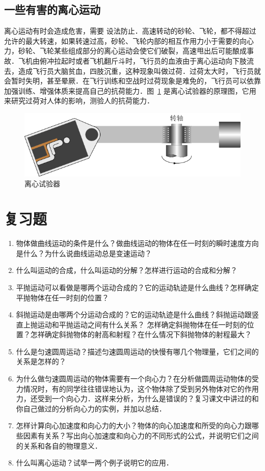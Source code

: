 \subsection{一些有害的离心运动} 

离心运动有时会造成危害，需要
设法防止．高速转动的砂轮、飞轮，都不得超过允许的最大转速，如果转速过高，砂轮、飞轮内部的相互作用力小于需要的向心力，砂轮、飞轮某些组成部分的离心运动会使它们破裂，高速甩出后可能酿成事故．飞机由俯冲拉起时或者飞机翻斤斗时，飞行员的血液由于离心运动向下肢流去，造成飞行员大脑贫血，四肢沉重，这种现象叫做过荷．过荷太大时，飞行员就会暂时失明，甚至晕厥．在飞行训练和空战时过荷现象是难免的，飞行员可以依靠加强训练、增强体质来提高自己的抗荷能力．图~\ref{fig_A_4-31} 是离心试验器的原理图，它用来研究过荷对人体的影响，测验人的抗荷能力．
\begin{figure}[htbp]
    \centering
    \includegraphics{fig/A/4-31.pdf}
    \caption{离心试验器}\label{fig_A_4-31}
\end{figure}

\section*{复习题}

\begin{enumerate}
	\item 物体做曲线运动的条件是什么？做曲线运动的物体在任一时刻的瞬时速度方向是什么？为什么说曲线运动总是变速运动？
\item 什么叫运动的合成，什么叫运动的分解？怎样进行运动的合成和分解？
\item 平抛运动可以看做是哪两个运动合成的？它的运动轨迹是什么曲线？怎样确定平抛物体在任一时刻的位置？
\item 斜抛运动是由哪两个分运动合成的？它的运动轨迹是什么曲线？斜抛运动跟竖直上抛运动和平抛运动之间有什么关系？
怎样确定斜抛物体在任一时刻的位置？怎祥确定斜抛物体的射高和射程？在什么情况下斜抛物体的射程最大？
\item 什么是匀速圆周运动？描述匀速圆周运动的快慢有哪几个物理量，它们之间的关系是怎样的？
\item 为什么做匀速圆周运动的物体需要有一个向心力？在分析做圆周运动物体的受力情况时，有的同学往往错误地认为，这个物体除了受到另外物体对它的作用力，还受到一个向心力．这样来分析，为什么是错误的？复习课文中讲过的和你自己做过的分析向心力的实例，并加以总结．
\item 怎样计算向心加速度和向心力的大小？物体的向心加速度和所受的向心力跟哪些因素有关系？写出向心加速度和向心力的不同形式的公式，并说明它们之间的关系和各自的物理意义．
\item  什么叫离心运动？试举一两个例子说明它的应用．
\end{enumerate}


